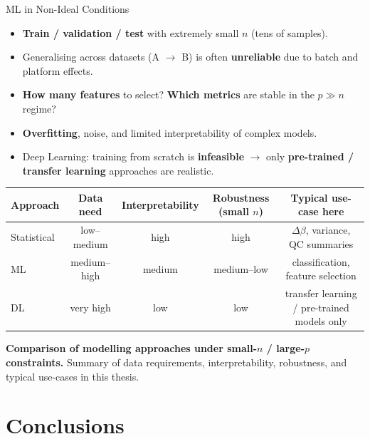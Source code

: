 \documentclass[8pt]{beamer}
\begin{document}
\begin{frame}{ML in Non-Ideal Conditions}

    \begin{itemize}[label=-]
        \item \textbf{Train / validation / test} with extremely small $n$ (tens of samples).
        \item Generalising across datasets (A $\rightarrow$ B) is often \textbf{unreliable} due to batch and platform effects.
        \item \alert{\textbf{How many features} to select? \textbf{Which metrics} are stable in the $p \gg n$ regime?}
        \item \textbf{Overfitting}, noise, and limited interpretability of complex models.
        \item Deep Learning: training from scratch is \textbf{infeasible} $\rightarrow$ only \textbf{pre-trained / transfer learning} approaches are realistic.
    \end{itemize}

    \vspace{0.4cm}
    \centering
    \begin{tabular}{lcccc}
        \toprule
        \textbf{Approach} & \textbf{Data need} & \textbf{Interpretability} & 
        \textbf{Robustness (small $n$)} & \textbf{Typical use-case here} \\
        \midrule
        Statistical & low--medium & high   & high        & $\Delta\beta$, variance, QC summaries \\
        ML          & medium--high & medium & medium--low & classification, feature selection     \\
        DL          & very high   & low    & low         & transfer learning / pre-trained models only \\
        \bottomrule
    \end{tabular}

    \vspace{0.15cm}
    {\small 
    \textbf{Comparison of modelling approaches under small-$n$ / large-$p$ constraints.}  
    Summary of data requirements, interpretability, robustness, and typical use-cases in this thesis.
    }

\end{frame}





\section{Conclusions}
\end{document}
